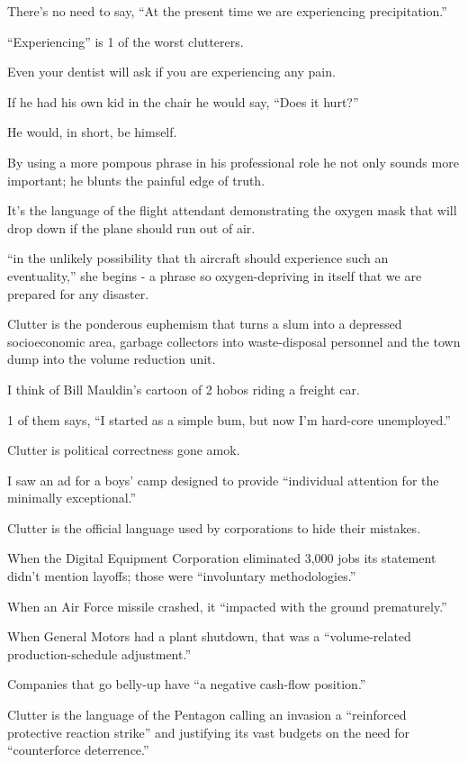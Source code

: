 \documentclass{book}
\numberwithin{equation}{section}
\begin{document}
There's no need to say, ``At the present time we are experiencing precipitation.''

%
``Experiencing'' is 1 of the worst clutterers.

Even your dentist will ask if you are experiencing any pain.

If he had his own kid in the chair he would say, ``Does it hurt?''

He would, in short, be himself.

By using a more pompous phrase in his professional role he not only sounds more important; he blunts the painful edge of truth.

It's the language of the flight attendant demonstrating the oxygen mask that will drop down if the plane should run out of air.

``in the unlikely possibility that th aircraft should experience such an eventuality,'' she begins - a phrase so oxygen-depriving in itself that we are prepared for any disaster.

%
Clutter is the ponderous euphemism that turns a slum into a depressed socioeconomic area, garbage collectors into waste-disposal personnel and the town dump into the volume reduction unit.

I think of Bill Mauldin's cartoon of 2 hobos riding a freight car.

1 of them says, ``I started as a simple bum, but now I'm hard-core unemployed.''

Clutter is political correctness gone amok.

I saw an ad for a boys' camp designed to provide ``individual attention for the minimally exceptional.''

%
Clutter is the official language used by corporations to hide their mistakes.

When the Digital Equipment Corporation eliminated 3,000 jobs its statement didn't mention layoffs; those were ``involuntary methodologies.''

When an Air Force missile crashed, it ``impacted with the ground prematurely.''

When General Motors had a plant shutdown, that was a ``volume-related production-schedule adjustment.''

Companies that go belly-up have ``a negative cash-flow position.''

%
Clutter is the language of the Pentagon calling an invasion a ``reinforced protective reaction strike'' and justifying its vast budgets on the need for ``counterforce deterrence.''
\end{document}
